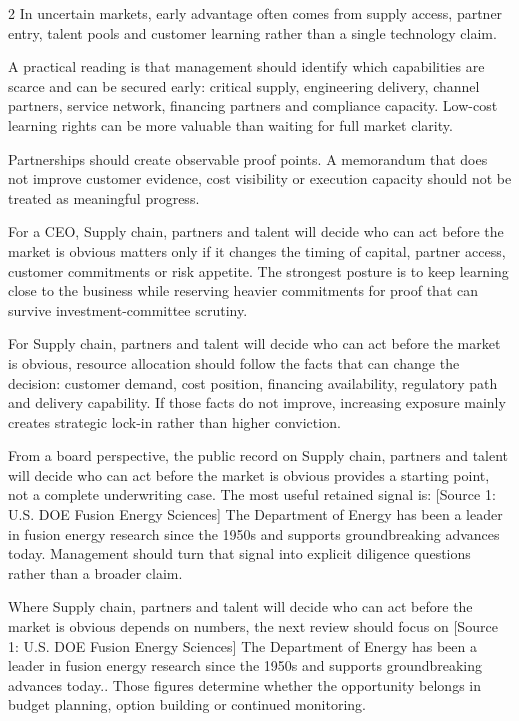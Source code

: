 \documentclass[10pt,a4paper]{article}
\begin{document}
\begin{multicols}{2}
{\small In uncertain markets, early advantage often comes from supply access, partner entry, talent pools and customer learning rather than a single technology claim.}\par
{\small A practical reading is that management should identify which capabilities are scarce and can be secured early: critical supply, engineering delivery, channel partners, service network, financing partners and compliance capacity. Low-cost learning rights can be more valuable than waiting for full market clarity.}\par
{\small Partnerships should create observable proof points. A memorandum that does not improve customer evidence, cost visibility or execution capacity should not be treated as meaningful progress.}\par
{\small For a CEO, Supply chain, partners and talent will decide who can act before the market is obvious matters only if it changes the timing of capital, partner access, customer commitments or risk appetite. The strongest posture is to keep learning close to the business while reserving heavier commitments for proof that can survive investment-committee scrutiny.}\par
{\small For Supply chain, partners and talent will decide who can act before the market is obvious, resource allocation should follow the facts that can change the decision: customer demand, cost position, financing availability, regulatory path and delivery capability. If those facts do not improve, increasing exposure mainly creates strategic lock-in rather than higher conviction.}\par
{\small From a board perspective, the public record on Supply chain, partners and talent will decide who can act before the market is obvious provides a starting point, not a complete underwriting case. The most useful retained signal is: [Source 1: U.S. DOE Fusion Energy Sciences] The Department of Energy has been a leader in fusion energy research since the 1950s and supports groundbreaking advances today. Management should turn that signal into explicit diligence questions rather than a broader claim.}\par
{\small Where Supply chain, partners and talent will decide who can act before the market is obvious depends on numbers, the next review should focus on [Source 1: U.S. DOE Fusion Energy Sciences] The Department of Energy has been a leader in fusion energy research since the 1950s and supports groundbreaking advances today.. Those figures determine whether the opportunity belongs in budget planning, option building or continued monitoring.}\par
\end{multicols}
\label{chap:8:end}
\end{document}
